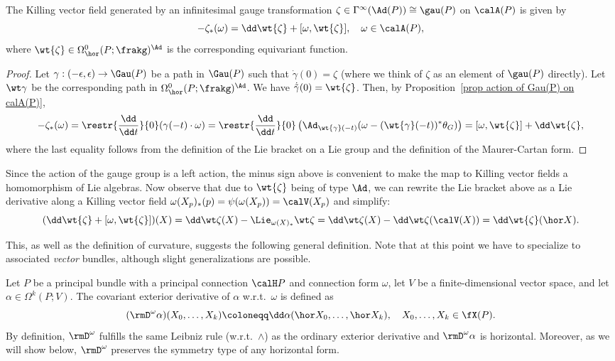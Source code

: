 \begin{prop}
    The Killing vector field generated by an infinitesimal gauge transformation $\zeta\in\Gamma^\infty(\Ad(P))\cong\gau(P)$ on $\calA(P)$ is given by
    \[-\zeta_\ast(\omega)=\dd \wt{\zeta}+[\omega,\wt{\zeta}],\quad \omega\in\calA(P),\]
    where $\wt{\zeta}\in \Omega^0_{\hor}(P;\frakg)^\Ad$ is the corresponding equivariant function.
\end{prop}
\begin{proof}
    Let $\gamma:(-\epsilon,\epsilon)\to \Gau(P)$ be a path in $\Gau(P)$ such that $\dot\gamma(0)=\zeta$ (where we think of $\zeta$ as an element of $\gau(P)$ directly). Let $\wt\gamma$ be the corresponding path in $\Omega^0_{\hor}(P;\frakg)^\Ad$. We have $\dot{\tilde{\gamma}}(0)=\wt{\zeta}$. Then, by Proposition~\ref{prop action of Gau(P) on calA(P)},
    \[-\zeta_\ast(\omega)=\restr{\frac{\dd}{\dd t}}{0}(\gamma(-t)\cdot \omega)=\restr{\frac{\dd}{\dd t}}{0}\left(\Ad_{\wt{\gamma}(-t)}(\omega-(\wt{\gamma}(-t))^\ast\theta_G)\right)=[\omega,\wt{\zeta}]+\dd\wt{\zeta},\]
    where the last equality follows from the definition of the Lie bracket on a Lie group and the definition of the Maurer-Cartan form.
\end{proof}


Since the action of the gauge group is a left action, the minus sign above is convenient to make the map to Killing vector fields a homomorphism of Lie algebras. Now observe that due to $\wt{\zeta}$ being of type $\Ad$, we can rewrite the Lie bracket above as a Lie derivative along a Killing vector field $\omega(X_p)_\ast(p)=\psi(\omega(X_p))=\calV(X_p)$ and simplify:
\[(\dd\wt{\zeta}+[\omega,\wt{\zeta}])(X)=
\dd\wt\zeta(X)-\Lie_{\omega(X)_\ast}\wt\zeta=
\dd\wt\zeta(X)-\dd\wt\zeta(\calV(X))=\dd\wt{\zeta}(\hor X).\label{eq 4791793}\]

This, as well as the definition of curvature, suggests the following general definition. Note that at this point we have to specialize to associated \emph{vector} bundles, although slight generalizations are possible.

\begin{defn}
    Let $P$ be a principal bundle with a principal connection $\calH P$ and connection form $\omega$, let $V$ be a finite-dimensional vector space, and let $\alpha\in\Omega^k(P;V)$. The covariant exterior derivative of $\alpha$ w.r.t.\ $\omega$ is defined as
    \[(\rmD^\omega \alpha)(X_0,\ldots,X_k)\coloneqq \dd\alpha(\hor X_0,\ldots,\hor X_k),\quad X_0,\ldots,X_k\in\fX(P).\]
    By definition, $\rmD^\omega$ fulfills the same Leibniz rule (w.r.t.\ $\wedge$) as the ordinary exterior derivative and $\rmD^\omega \alpha$ is horizontal. Moreover, as we will show below, $\rmD^\omega$ preserves the symmetry type of any horizontal form.
\end{defn}

